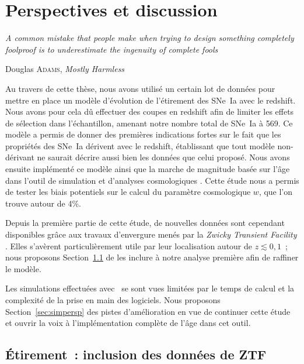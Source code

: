 \documentclass[../main/main.tex]{subfiles}
\begin{document}
\dominitoc
\faketableofcontents
\dominilof
\fakelistoffigures
\dominilot
\fakelistoftables

\chapter{Perspectives et discussion}\label{ch:persp}
\epigraph{\openquote\textit{A common mistake that people make when trying to
design something completely foolproof is to underestimate the ingenuity of
complete fools}\closequote}{Douglas \textsc{Adams}, \textit{Mostly Harmless}}

Au travers de cette thèse, nous avons utilisé un certain lot de données pour
mettre en place un modèle d'évolution de l'étirement des SNe~Ia avec le
redshift. Nous avons pour cela dû effectuer des coupes en redshift afin de
limiter les effets de sélection dans l'échantillon, amenant notre nombre total
de SNe~Ia à 569. Ce modèle a permis de donner des premières indications fortes
sur le fait que les propriétés des SNe~Ia dérivent avec le redshift, établissant
que tout modèle non-dérivant ne saurait décrire aussi bien les données que celui
proposé. Nous avons ensuite implémenté ce modèle ainsi que la marche de
magnitude basée sur l'âge dans l'outil de simulation et d'analyses cosmologiques
\snana. Cette étude nous a permis de tester les biais potentiels sur le calcul
du paramètre cosmologique $w$, que l'on trouve autour de 4\%.

Depuis la première partie de cette étude, de nouvelles données sont cependant
disponibles grâce aux travaux d'envergure menés par la \textit{Zwicky Transient
Facility} \citep[ZTF,][]{bellm2019}. Elles s'avèrent particulièrement utile par
leur localisation autour de $z \lesssim 0,1$~; nous proposons
Section~\ref{sec:xztf} de les inclure à notre analyse première afin de raffiner
le modèle.

Les simulations effectuées avec \snana\ se sont vues limitées par le temps de
calcul et la complexité de la prise en main des logiciels. Nous proposons
Section~\ref{sec:simpersp} des pistes d'amélioration en vue de continuer cette
étude et ouvrir la voix à l'implémentation complète de l'âge dans cet outil.

\vfill
\minitoc
\vfill

\newpage

\section{Étirement~: inclusion des données de ZTF}\label{sec:xztf}
\end{document}

